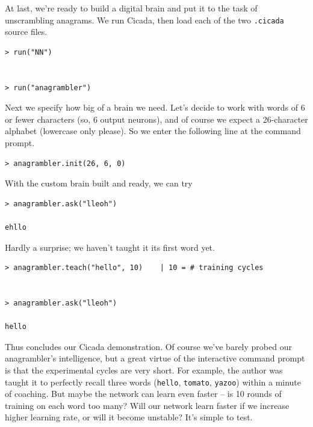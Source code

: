 \documentclass{article}
\newenvironment{code}{
       \begin{list}{}{
               \setlength{\leftmargin}{.4in}
               \setlength{\rightmargin}{0in}
               \setlength{\topsep}{.2in}
       }
       \small
       \item[] }
       { \end{list}   }
\begin{document}
At last, we're ready to build a digital brain and put it to the task of unscrambling anagrams.  We run Cicada, then load each of the two \verb#.cicada# source files.

\begin{code} \begin{verbatim}
> run("NN")


> run("anagrambler")
\end{verbatim} \end{code}

Next we specify how big of a brain we need.  Let's decide to work with words of 6 or fewer characters (so, 6 output neurons), and of course we expect a 26-character alphabet (lowercase only please).  So we enter the following line at the command prompt.

\begin{code} \begin{verbatim}
> anagrambler.init(26, 6, 0)
\end{verbatim} \end{code}

With the custom brain built and ready, we can try

\begin{code} \begin{verbatim}
> anagrambler.ask("lleoh")

ehllo
\end{verbatim} \end{code}

\noindent Hardly a surprise; we haven't taught it its first word yet.

\begin{code} \begin{verbatim}
> anagrambler.teach("hello", 10)    | 10 = # training cycles


> anagrambler.ask("lleoh")

hello
\end{verbatim} \end{code}

Thus concludes our Cicada demonstration.  Of course we've barely probed our anagrambler's intelligence, but a great virtue of the interactive command prompt is that the experimental cycles are very short.  For example, the author was taught it to perfectly recall three words (\verb#hello#, \verb#tomato#, \verb#yazoo#) within a minute of coaching.  But maybe the network can learn even faster -- is 10 rounds of training on each word too many?  Will our network learn faster if we increase higher learning rate, or will it become unstable?  It's simple to test.
\end{document}
